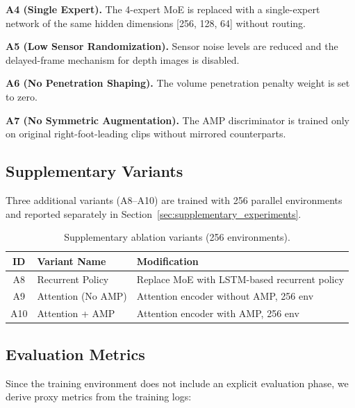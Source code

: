 \textbf{A4 (Single Expert).} The 4-expert MoE is replaced with a single-expert network of the same hidden dimensions [256, 128, 64] without routing.

\textbf{A5 (Low Sensor Randomization).} Sensor noise levels are reduced and the delayed-frame mechanism for depth images is disabled.

\textbf{A6 (No Penetration Shaping).} The volume penetration penalty weight is set to zero.

\textbf{A7 (No Symmetric Augmentation).} The AMP discriminator is trained only on original right-foot-leading clips without mirrored counterparts.

\subsection{Supplementary Variants}
\label{sec:supplementary_variants}

Three additional variants (A8--A10) are trained with 256 parallel environments and reported separately in Section~\ref{sec:supplementary_experiments}.

\begin{table}[t]
\centering
\caption{Supplementary ablation variants (256 environments).}
\label{tab:supplementary_variants}
\begin{tabular}{cll}
\toprule
\textbf{ID} & \textbf{Variant Name} & \textbf{Modification} \\
\midrule
A8 & Recurrent Policy & Replace MoE with LSTM-based recurrent policy \\
A9 & Attention (No AMP) & Attention encoder without AMP, 256 env \\
A10 & Attention + AMP & Attention encoder with AMP, 256 env \\
\bottomrule
\end{tabular}
\end{table}

\subsection{Evaluation Metrics}
\label{sec:eval_metrics}

Since the training environment does not include an explicit evaluation phase, we derive proxy metrics from the training logs:

